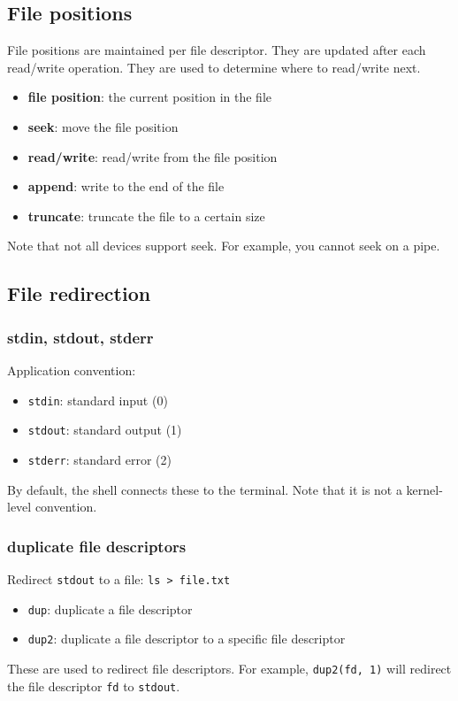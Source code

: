 \documentclass[letterpaper,12pt]{article}
\begin{document}
\subsection{File positions}
File positions are maintained per file descriptor. They are updated after each read/write operation. They are used to determine where to read/write next.
\begin{itemize}
    \item \textbf{file position}: the current position in the file
    \item \textbf{seek}: move the file position
    \item \textbf{read/write}: read/write from the file position
    \item \textbf{append}: write to the end of the file
    \item \textbf{truncate}: truncate the file to a certain size
\end{itemize}
Note that not all devices support seek. For example, you cannot seek on a pipe.
\subsection{File redirection}
\subsubsection{stdin, stdout, stderr}
Application convention: \begin{itemize}
    \item \texttt{stdin}: standard input (0)
    \item \texttt{stdout}: standard output (1)
    \item \texttt{stderr}: standard error (2)
\end{itemize}
By default, the shell connects these to the terminal. Note that it is not a kernel-level convention.

\subsubsection{duplicate file descriptors}
Redirect \texttt{stdout} to a file: \texttt{ls > file.txt}


\begin{itemize}
    \item \texttt{dup}: duplicate a file descriptor
    \item \texttt{dup2}: duplicate a file descriptor to a specific file descriptor
\end{itemize}
These are used to redirect file descriptors. For example, \texttt{dup2(fd, 1)} will redirect the file descriptor \texttt{fd} to \texttt{stdout}.
\end{document}
